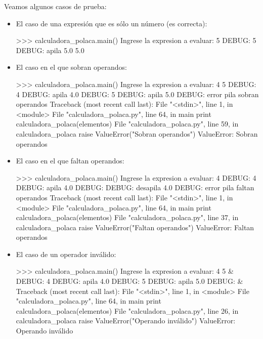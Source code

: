 Veamos algunos casos de prueba:

\begin{itemize}
\item El caso de una expresión que es sólo un número (es correcta):

\begin{codigo-python-sn}
>>> calculadora_polaca.main()
Ingrese la expresion a evaluar: 5
DEBUG: 5
DEBUG: apila  5.0
5.0
\end{codigo-python-sn}

\item El caso en el que sobran operandos:

\begin{codigo-python-sn}
>>> calculadora_polaca.main()
Ingrese la expresion a evaluar: 4 5
DEBUG: 4
DEBUG: apila  4.0
DEBUG: 5
DEBUG: apila  5.0
DEBUG: error pila sobran operandos
Traceback (most recent call last):
  File "<stdin>", line 1, in <module>
  File "calculadora_polaca.py", line 64, in main
    print calculadora_polaca(elementos)
  File "calculadora_polaca.py", line 59, in calculadora_polaca
    raise ValueError("Sobran operandos")
ValueError: Sobran operandos
\end{codigo-python-sn}

\item El caso en el que faltan operandos:

\begin{codigo-python-sn}
>>> calculadora_polaca.main()
Ingrese la expresion a evaluar: 4 %
DEBUG: 4
DEBUG: apila  4.0
DEBUG: %
DEBUG: desapila  4.0
DEBUG: error pila faltan operandos
Traceback (most recent call last):
  File "<stdin>", line 1, in <module>
  File "calculadora_polaca.py", line 64, in main
    print calculadora_polaca(elementos)
  File "calculadora_polaca.py", line 37, in calculadora_polaca
    raise ValueError("Faltan operandos")
ValueError: Faltan operandos
\end{codigo-python-sn}

\item El caso de un operador inválido:

\begin{codigo-python-sn}
>>> calculadora_polaca.main()
Ingrese la expresion a evaluar: 4 5 &
DEBUG: 4
DEBUG: apila  4.0
DEBUG: 5
DEBUG: apila  5.0
DEBUG: &
Traceback (most recent call last):
  File "<stdin>", line 1, in <module>
  File "calculadora_polaca.py", line 64, in main
    print calculadora_polaca(elementos)
  File "calculadora_polaca.py", line 26, in calculadora_polaca
    raise ValueError("Operando inválido")
ValueError: Operando inválido
\end{codigo-python-sn}


\end{itemize}
